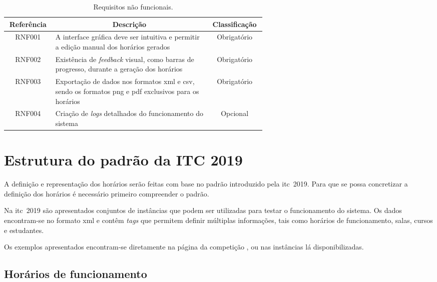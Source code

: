 {
\setlength{\tabcolsep}{.8em}
\begin{table}[htbp]
    \centering
    \caption{Requisitos não funcionais.}
    \label{tabela:requisitos-nao-funcionais}
    \begin{tabular}{c p{0.6\linewidth} c}
        \toprule
        \textbf{Referência} & \multicolumn{1}{c}{\textbf{Descrição}} & \textbf{Classificação} \\ \midrule
        RNF001     & A interface gráfica deve ser intuitiva e permitir a edição manual dos horários gerados   & Obrigatório   \\ \midrule
        RNF002     & Existência de \textit{feedback} visual, como barras de progresso, durante a geração dos horários & Obrigatório   \\ \midrule
        RNF003 &
        Exportação de dados nos formatos \gls{xml} e \gls{csv}, sendo os formatos \gls{png} e \gls{pdf} exclusivos para os horários &
        Obrigatório \\ \midrule
        RNF004     & Criação de \textit{logs} detalhados do funcionamento do sistema                          & Opcional      \\ \bottomrule
    \end{tabular}
\end{table}
}

\section{Estrutura do padrão da ITC 2019}
\label{capitulo3:Padrao-itc2019}

A definição e representação dos horários serão feitas com base no padrão introduzido pela \gls{itc}~2019. Para que se possa concretizar a definição dos horários é necessário primeiro compreender o padrão.

Na \gls{itc}~2019 são apresentados conjuntos de instâncias que podem ser utilizadas para testar o funcionamento do sistema. Os dados encontram-se no formato \gls{xml} e contêm \textit{tags} que permitem definir múltiplas informações, tais como horários de funcionamento, salas, cursos e estudantes.

Os exemplos apresentados encontram-se diretamente na página da competição \cite{itc2019-Website}, ou nas instâncias lá disponibilizadas.

\subsection{Horários de funcionamento}

